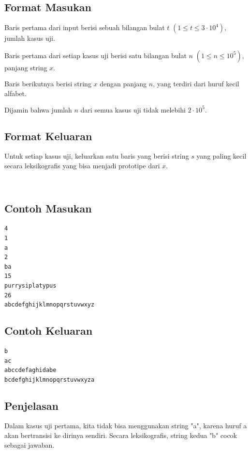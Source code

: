 \documentclass{article}
\begin{document}
\subsection*{Format Masukan}

Baris pertama dari input berisi sebuah bilangan bulat $t$ $(1 \leq t \leq 3 \cdot 10^4)$, jumlah kasus uji.

Baris pertama dari setiap kasus uji berisi satu bilangan bulat $n$ $(1 \leq n \leq 10^5)$, panjang string $x$.

Baris berikutnya berisi string $x$ dengan panjang $n$, yang terdiri dari huruf kecil alfabet.

Dijamin bahwa jumlah $n$ dari semua kasus uji tidak melebihi $2 \cdot 10^5$.



\subsection*{Format Keluaran}

Untuk setiap kasus uji, keluarkan satu baris yang berisi string $s$ yang paling kecil secara leksikografis yang bisa menjadi prototipe dari $x$.

\\

\begin{multicols}{2}
\subsection*{Contoh Masukan}
\begin{lstlisting}
4
1
a
2
ba
15
purrysiplatypus
26
abcdefghijklmnopqrstuvwxyz

\end{lstlisting}
\columnbreak
\subsection*{Contoh Keluaran}
\begin{lstlisting}
b
ac
abccdefaghidabe
bcdefghijklmnopqrstuvwxyza
\end{lstlisting}
\end{multicols}

\subsection*{Penjelasan}
Dalam kasus uji pertama, kita tidak bisa menggunakan string "a", karena huruf a akan bertransisi ke dirinya sendiri. Secara leksikografis, string kedua "b" cocok sebagai jawaban.
\end{document}

